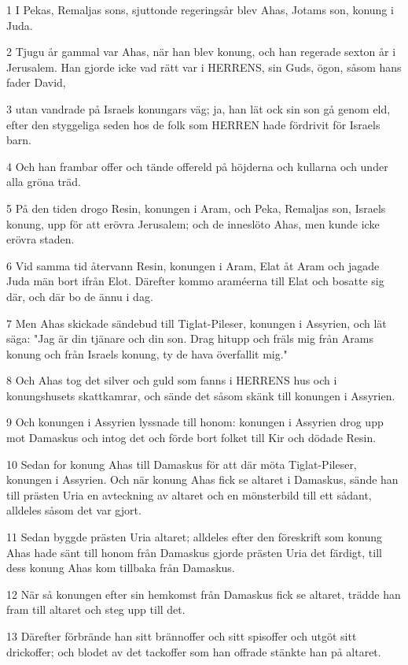 \par 1 I Pekas, Remaljas sons, sjuttonde regeringsår blev Ahas, Jotams son, konung i Juda.
\par 2 Tjugu år gammal var Ahas, när han blev konung, och han regerade sexton år i Jerusalem. Han gjorde icke vad rätt var i HERRENS, sin Guds, ögon, såsom hans fader David,
\par 3 utan vandrade på Israels konungars väg; ja, han lät ock sin son gå genom eld, efter den styggeliga seden hos de folk som HERREN hade fördrivit för Israels barn.
\par 4 Och han frambar offer och tände offereld på höjderna och kullarna och under alla gröna träd.
\par 5 På den tiden drogo Resin, konungen i Aram, och Peka, Remaljas son, Israels konung, upp för att erövra Jerusalem; och de inneslöto Ahas, men kunde icke erövra staden.
\par 6 Vid samma tid återvann Resin, konungen i Aram, Elat åt Aram och jagade Juda män bort ifrån Elot. Därefter kommo araméerna till Elat och bosatte sig där, och där bo de ännu i dag.
\par 7 Men Ahas skickade sändebud till Tiglat-Pileser, konungen i Assyrien, och lät säga: "Jag är din tjänare och din son. Drag hitupp och fräls mig från Arams konung och från Israels konung, ty de hava överfallit mig."
\par 8 Och Ahas tog det silver och guld som fanns i HERRENS hus och i konungshusets skattkamrar, och sände det såsom skänk till konungen i Assyrien.
\par 9 Och konungen i Assyrien lyssnade till honom: konungen i Assyrien drog upp mot Damaskus och intog det och förde bort folket till Kir och dödade Resin.
\par 10 Sedan for konung Ahas till Damaskus för att där möta Tiglat-Pileser, konungen i Assyrien. Och när konung Ahas fick se altaret i Damaskus, sände han till prästen Uria en avteckning av altaret och en mönsterbild till ett sådant, alldeles såsom det var gjort.
\par 11 Sedan byggde prästen Uria altaret; alldeles efter den föreskrift som konung Ahas hade sänt till honom från Damaskus gjorde prästen Uria det färdigt, till dess konung Ahas kom tillbaka från Damaskus.
\par 12 När så konungen efter sin hemkomst från Damaskus fick se altaret, trädde han fram till altaret och steg upp till det.
\par 13 Därefter förbrände han sitt brännoffer och sitt spisoffer och utgöt sitt drickoffer; och blodet av det tackoffer som han offrade stänkte han på altaret.
